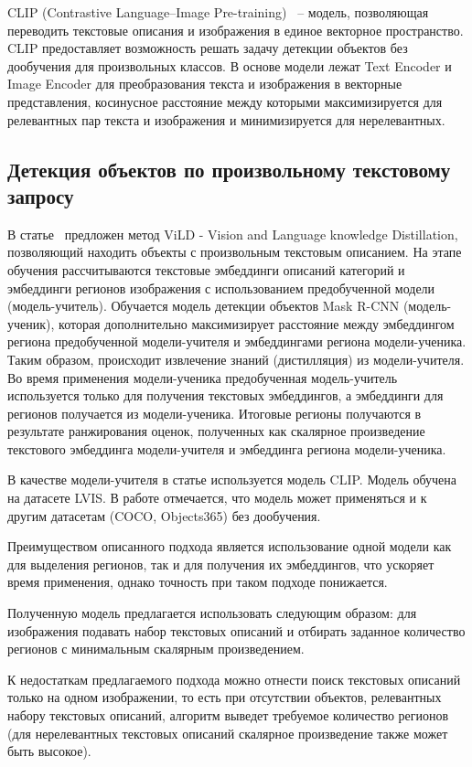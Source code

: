 \documentclass[a4paper,14pt]{article}
\begin{document}
    CLIP (Contrastive Language–Image Pre-training)~\cite{CLIP} -- модель, позволяющая переводить текстовые описания и изображения в единое векторное пространство.
    CLIP предоставляет возможность решать задачу детекции объектов без дообучения для произвольных классов.
    В основе модели лежат Text Encoder и Image Encoder для преобразования текста и изображения в векторные представления, косинусное расстояние между которыми максимизируется для релевантных пар текста и изображения и минимизируется для нерелевантных.

    \subsection{Детекция объектов по произвольному текстовому запросу}

    В статье~\cite{ViLD} предложен метод ViLD - Vision and Language knowledge Distillation, позволяющий находить объекты с произвольным текстовым описанием.
    На этапе обучения рассчитываются текстовые эмбеддинги описаний категорий и эмбеддинги регионов изображения с использованием предобученной модели (модель-учитель).
    Обучается модель детекции объектов Mask R-CNN (модель-ученик), которая дополнительно максимизирует расстояние между эмбеддингом региона предобученной модели-учителя и эмбеддингами региона модели-ученика.
    Таким образом, происходит извлечение знаний (дистилляция) из модели-учителя.
    Во время применения модели-ученика предобученная модель-учитель используется только для получения текстовых эмбеддингов, а эмбеддинги для регионов получается из модели-ученика.
    Итоговые регионы получаются в результате ранжирования оценок, полученных как скалярное произведение текстового эмбеддинга модели-учителя и эмбеддинга региона модели-ученика.

    В качестве модели-учителя в статье используется модель CLIP.
    Модель обучена на датасете LVIS. В работе отмечается, что модель может применяться и к другим датасетам (COCO, Objects365) без дообучения.

    Преимуществом описанного подхода является использование одной модели как для выделения регионов, так и для получения их эмбеддингов, что ускоряет время применения, однако точность при таком подходе понижается.

    Полученную модель предлагается использовать следующим образом: для изображения подавать набор текстовых описаний и отбирать заданное количество регионов с минимальным скалярным произведением.

    К недостаткам предлагаемого подхода можно отнести поиск текстовых описаний только на одном изображении, то есть при отсутствии объектов, релевантных набору текстовых описаний, алгоритм выведет требуемое количество регионов (для нерелевантных текстовых описаний скалярное произведение также может быть высокое).
\end{document}
